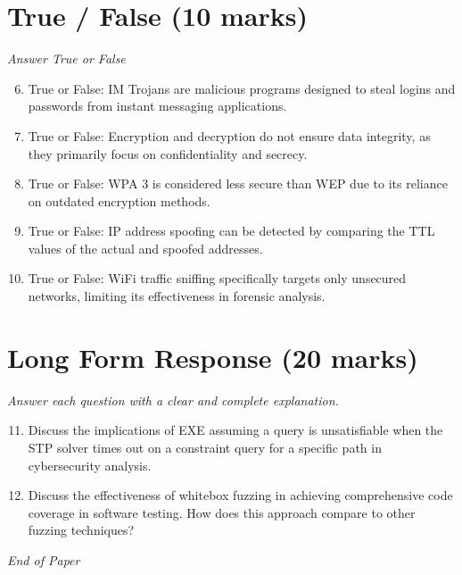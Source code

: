 \documentclass[12pt]{article}
\begin{document}
\section*{True / False (10 marks)}
\textit{Answer True or False}
\begin{enumerate}[label=\arabic*.]
\setcounter{enumi}{5}
\item True or False: IM Trojans are malicious programs designed to steal logins and passwords from instant messaging applications.
\item True or False: Encryption and decryption do not ensure data integrity, as they primarily focus on confidentiality and secrecy.
\item True or False: WPA 3 is considered less secure than WEP due to its reliance on outdated encryption methods.
\item True or False: IP address spoofing can be detected by comparing the TTL values of the actual and spoofed addresses.
\item True or False: WiFi traffic sniffing specifically targets only unsecured networks, limiting its effectiveness in forensic analysis.
\end{enumerate}

\section*{Long Form Response (20 marks)}
\textit{Answer each question with a clear and complete explanation.}
\begin{enumerate}[label=\arabic*.]
\setcounter{enumi}{10}
\item Discuss the implications of EXE assuming a query is unsatisfiable when the STP solver times out on a constraint query for a specific path in cybersecurity analysis.
\item Discuss the effectiveness of whitebox fuzzing in achieving comprehensive code coverage in software testing. How does this approach compare to other fuzzing techniques?
\end{enumerate}

\vfill
\noindent\textit{End of Paper}
\end{document}
